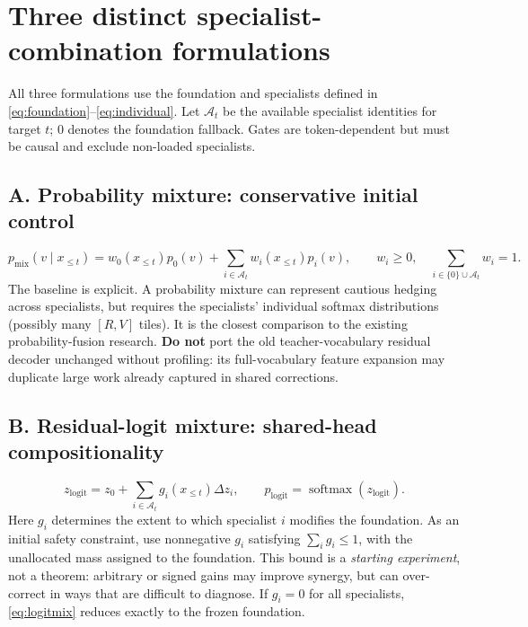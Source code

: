 \documentclass[11pt,letterpaper]{article}
\newcommand{\softmax}{\operatorname{softmax}}
\begin{document}
\section{Three distinct specialist-combination formulations}
\label{sec:alternatives}
All three formulations use the foundation and specialists defined in \eqref{eq:foundation}--\eqref{eq:individual}. Let $\mathcal A_t$ be the available specialist identities for target $t$; $0$ denotes the foundation fallback. Gates are token-dependent but must be causal and exclude non-loaded specialists.

\subsection{A. Probability mixture: conservative initial control}
\begin{equation}
 p_{\mathrm{mix}}(v\mid x_{\le t})=
 w_0(x_{\le t})p_0(v)+\sum_{i\in\mathcal A_t}w_i(x_{\le t})p_i(v),\qquad
 w_i\geq0,\quad\sum_{i\in\{0\}\cup\mathcal A_t}w_i=1.
 \label{eq:pmix}
\end{equation}
The baseline is explicit. A probability mixture can represent cautious hedging across specialists, but requires the specialists' individual softmax distributions (possibly many $[R,V]$ tiles). It is the closest comparison to the existing probability-fusion research. \textbf{Do not} port the old teacher-vocabulary residual decoder unchanged without profiling: its full-vocabulary feature expansion may duplicate large work already captured in shared corrections.

\subsection{B. Residual-logit mixture: shared-head compositionality}
\begin{equation}
 z_{\mathrm{logit}}=z_0+\sum_{i\in\mathcal A_t}g_i(x_{\le t})\Delta z_i,
 \qquad p_{\mathrm{logit}}=\softmax(z_{\mathrm{logit}}).
 \label{eq:logitmix}
\end{equation}
Here $g_i$ determines the extent to which specialist $i$ modifies the foundation. As an initial safety constraint, use nonnegative $g_i$ satisfying $\sum_i g_i\le 1$, with the unallocated mass assigned to the foundation. This bound is a \emph{starting experiment}, not a theorem: arbitrary or signed gains may improve synergy, but can over-correct in ways that are difficult to diagnose. If $g_i=0$ for all specialists, \eqref{eq:logitmix} reduces exactly to the frozen foundation.
\end{document}
